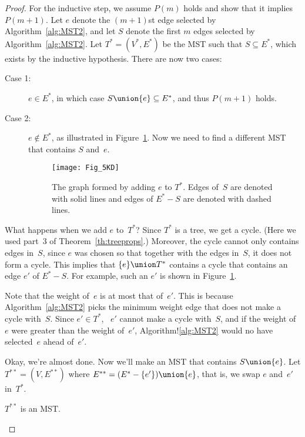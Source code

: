\begin{proof}
For the inductive step, we assume $P(m)$ holds and show that it
implies $P(m + 1)$.  Let $e$ denote the $(m+1)$st edge selected by
Algorithm~\ref{alg:MST2}, and let $S$ denote the first $m$ edges
selected by Algorithm~\ref{alg:MST2}.  Let $T^* = (V^*, E^*)$ be the
MST such that $S \subseteq E^*$, which exists by the inductive
hypothesis.  There are now two cases:
\begin{description}

\item[Case 1:]
$e \in E^*$, in which case $S \union \{e\} \subseteq E^*$, and thus
  $P(m+1)$ holds.

\item[Case 2:]
$e \notin E^*$, as illustrated in Figure~\ref{fig:5KD}.  Now we need
  to find a different MST that contains $S$ and~$e$.

\begin{figure}\redrawn

\texttt{[image: Fig\_5KD]}

\caption{The graph formed by adding $e$ to $T^*$.  Edges of~$S$ are
  denoted with solid lines and edges of $E^* - S$ are denoted with
  dashed lines.}

\label{fig:5KD}
\end{figure}

\end{description}

What happens when we add $e$ to~$T^*$?  Since $T^*$ is a tree, we get
a cycle.  (Here we used part~3 of Theorem~\ref{th:treeprops}.)
Moreover, the cycle cannot only contains edges in~$S$, since $e$ was
chosen so that together with the edges in~$S$, it does not form a
cycle.  This implies that $\{e\} \union T^*$ contains a cycle that
contains an edge $e'$ of $E^* - S$.  For example, such an $e'$ is
shown in Figure~\ref{fig:5KD}.

Note that the weight of~$e$ is at most that of~$e'$.  This is because
Algorithm~\ref{alg:MST2} picks the minimum weight edge that does not
make a cycle with~$S$.  Since $e' \in T^*$, \ $e'$ cannot make a cycle
with~$S$, and if the weight of~$e$ were greater than the weight
of~$e'$, Algorithm!\ref{alg:MST2} would no have selected~$e$ ahead
of~$e'$.

Okay, we're almost done.  Now we'll make an MST that contains $S
\union \{e\}$.  Let $T^{**} = (V, E^{**})$ where $E^{**} = (E^* -
\{e'\}) \union \{e\}$, that is, we swap $e$ and~$e'$ in~$T^*$.

\begin{claim}\label{claim:MST2}
$T^{**}$ is an MST.
\end{claim}


\end{proof}
